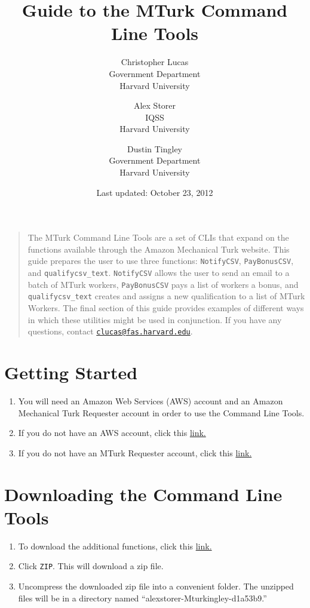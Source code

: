 \documentclass[10pt]{article}
\title{Guide to the MTurk Command Line Tools}
\author{Christopher Lucas\\
        Government Department\\
        Harvard University\\
      \and
        Alex Storer\\
        IQSS\\
        Harvard University\\
      \and
        Dustin Tingley\\
        Government Department\\
        Harvard University}
\date{Last updated: October 23, 2012}
\begin{document}
\maketitle

\begin{quotation}
\noindent The MTurk Command Line Tools are a set of CLIs that expand on the functions available through the Amazon Mechanical Turk website. This guide prepares the user to use three functions: \verb+NotifyCSV+, \verb+PayBonusCSV+, and \verb+qualifycsv_text+. \verb+NotifyCSV+ allows the user to send an email to 
a batch of MTurk workers, \verb+PayBonusCSV+ pays a list of workers a bonus, and 
\verb+qualifycsv_text+ creates and assigns a new qualification to a list of MTurk 
Workers. The final section of this guide provides examples of different ways in which 
these utilities might be used in conjunction. If you have any questions, contact \href{mailto:clucas@fas.harvard.edu}{\nolinkurl{clucas@fas.harvard.edu}}.
\end{quotation}

\section*{Getting Started}

\begin{enumerate}
	\item You will need an Amazon Web Services (AWS) account and an Amazon Mechanical Turk Requester account in order to use the Command Line Tools. 
	\item If you do not have an AWS account, click this \href{https://aws-portal.amazon.com/gp/aws/developer/registration/index.html}{link.}
	\item If you do not have an MTurk Requester account, click this \href{https://www.amazon.com/gp/aws/ssop/index.html?awscbctx=&awscbid=1PAVRHWQ0W17WVS868G2&awscredential=&awsnoclientpipeline=true&awsstrict=false&awsturknosubway=true&wa=wsignin1.0&wctx=&wreply=https\%3A\%2F\%2Frequester.mturk.com\%2Fend_signin&wtrealm=1PAVRHWQ0W17WVS868G2&awssig=8EwI\%2FStQzSbYuJTv3SrgxdaEqAA\%3D}{link.}
\end{enumerate}

\section*{Downloading the Command Line Tools}
\begin{enumerate}
	\item To download the additional functions, click this \href{https://github.com/alexstorer/MTurkingley}{link.}
	\item Click \verb+ZIP+. This will download a zip file.
	\item Uncompress the downloaded zip file into a convenient folder. The unzipped files will be in a directory named ``alexstorer-Mturkingley-d1a53b9.''

\end{enumerate}
\end{document}
